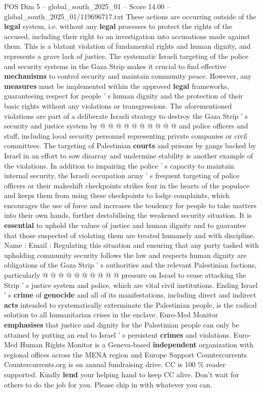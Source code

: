 \begin{textsample}{POS Dim 5 – global\_south\_2025\_01 – Score 14.00 – global\_south\_2025\_01/119696717.txt}
These actions are occurring outside of the \textbf{legal} system, i.e. without any \textbf{legal} processes to protect the rights of the accused, including their right to an investigation into accusations made against them.
This is a blatant violation of fundamental rights and human dignity, and represents a grave lack of justice.
The systematic Israeli targeting of the police and security systems in the Gaza Strip makes it crucial to find effective \textbf{mechanisms} to control security and maintain community peace.
However, any \textbf{measures} must be implemented within the approved \textbf{legal} frameworks, guaranteeing respect for people ' s human dignity and the protection of their basic rights without any violations or transgressions.
The aforementioned violations are part of a deliberate Israeli strategy to destroy the Gaza Strip ' s security and justice system by @ @ @ @ @ @ @ @ @ @ and police officers and staff, including local security personnel representing private companies or civil committees.
The targeting of Palestinian \textbf{courts} and prisons by gangs backed by Israel in an effort to sow disarray and undermine stability is another example of the violations.
In addition to impairing the police ' s capacity to maintain internal security, the Israeli occupation army ' s frequent targeting of police officers or their makeshift checkpoints strikes fear in the hearts of the populace and keeps them from using these checkpoints to lodge complaints, which encourages the use of force and increases the tendency for people to take matters into their own hands, further destabilising the weakened security situation.
It is \textbf{essential} to uphold the values of justice and human dignity and to guarantee that those suspected of violating them are treated humanely and with discipline.
Name : Email : Regulating this situation and ensuring that any party tasked with upholding community security follows the law and respects human dignity are obligations of the Gaza Strip ' s authorities and the relevant Palestinian factions, particularly @ @ @ @ @ @ @ @ @ @ pressure on Israel to cease attacking the Strip ' s justice system and police, which are vital civil institutions.
Ending Israel ' s \textbf{crime} of \textbf{genocide} and all of its manifestations, including direct and indirect \textbf{acts} intended to systematically exterminate the Palestinian people, is the radical solution to all humanitarian crises in the enclave.
Euro-Med Monitor \textbf{emphasises} that justice and dignity for the Palestinian people can only be attained by putting an end to Israel ' s persistent \textbf{crimes} and violations.
Euro-Med Human Rights Monitor is a Geneva-based \textbf{independent} organization with regional offices across the MENA region and Europe Support Countercurrents Countercurrents.org is on annual fundraising drive.
CC is 100 \% reader supported.
Kindly \textbf{lend} your helping hand to keep CC alive.
Don't wait for others to do the job for you.
Please chip in with whatever you can.

\end{textsample}
